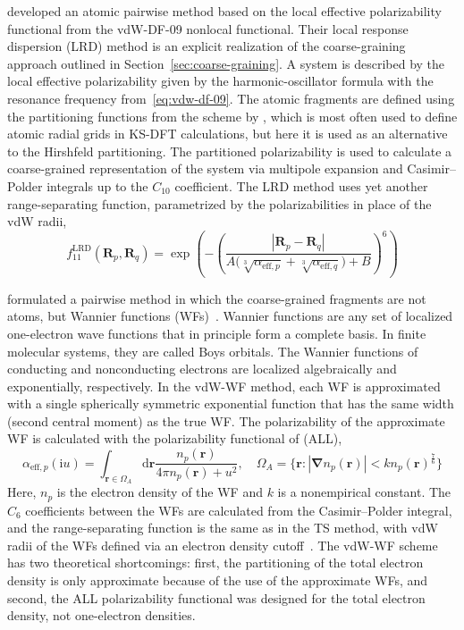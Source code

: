 \citet{SatoJCP09,SatoJCP10} developed an atomic pairwise method based on the local effective polarizability functional from the vdW-DF-09 nonlocal functional.
Their local response dispersion (LRD) method is an explicit realization of the coarse-graining approach outlined in Section~\ref{sec:coarse-graining}.
A system is described by the local effective polarizability given by the harmonic-oscillator formula with the resonance frequency from~\eqref{eq:vdw-df-09}.
The atomic fragments are defined using the partitioning functions from the scheme by \citet{BeckeJCP88}, which is most often used to define atomic radial grids in KS-DFT calculations, but here it is used as an alternative to the Hirshfeld partitioning.
The partitioned polarizability is used to calculate a coarse-grained representation of the system via multipole expansion and Casimir--Polder integrals up to the $C_{10}$ coefficient.
The LRD method uses yet another range-separating function, parametrized by the polarizabilities in place of the vdW radii,
\begin{equation}
  f_{11}^\text{LRD}(\mathbf R_p,\mathbf R_q)
  =\exp\left(
    -\left(
      \frac
        {|\mathbf R_p-\mathbf R_q|}
        {A\big(\sqrt[3]{\alpha_{\text{eff},p}}+\sqrt[3]{\alpha_{\text{eff},q}}\big)+B}
    \right)^6
  \right)
\end{equation}

\citet{SilvestrelliPRL08} formulated a pairwise method in which the coarse-grained fragments are not atoms, but Wannier functions (WFs)~\cite{MarzariRMP12}.
Wannier functions are any set of localized one-electron wave functions that in principle form a complete basis.
In finite molecular systems, they are called Boys orbitals.
The Wannier functions of conducting and nonconducting electrons are localized algebraically and exponentially, respectively.
In the vdW-WF method, each WF is approximated with a single spherically symmetric exponential function that has the same width (second central moment) as the true WF\@.
The polarizability of the approximate WF is calculated with the polarizability functional of \citet*{AnderssonPRL96} (ALL),
\begin{equation}
  \alpha_{\text{eff},p}(\mathrm iu)
  =\int_{\mathbf r\in\Omega_A}
  \mathrm d\mathbf r\frac{n_p(\mathbf r)}{4\pi n_p(\mathbf r)+u^2},\quad
    \Omega_A=\{\mathbf r:|\mathbf\nabla n_p(\mathbf r)|<kn_p(\mathbf r)^\frac76\}
\end{equation}
Here, $n_p$ is the electron density of the WF and $k$ is a nonempirical constant.
The $C_6$ coefficients between the WFs are calculated from the Casimir--Polder integral, and the range-separating function is the same as in the TS method, with vdW radii of the WFs defined via an electron density cutoff~\cite{SilvestrelliJCP09}.
The vdW-WF scheme has two theoretical shortcomings: first, the partitioning of the total electron density is only approximate because of the use of the approximate WFs, and second, the ALL polarizability functional was designed for the total electron density, not one-electron densities.


